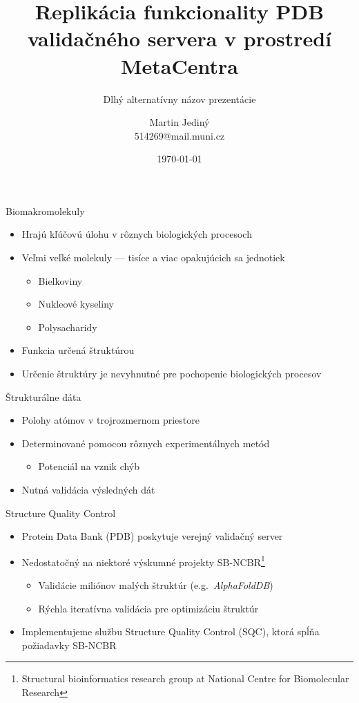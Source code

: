 \documentclass[
  aspectratio=169,
]{beamer}
\title[Structure Quality Control]{Replikácia funkcionality PDB validačného servera v prostredí MetaCentra}
\subtitle[Alternatívny názov prezentácie]{Dlhý alternatívny názov prezentácie}
\author[M.\, Jediný]{Martin Jediný\texorpdfstring{\\}{, }514269@mail.muni.cz}
\institute[FI MU]{Fakulta informatiky Masarykovej univerzity}
\date{\today}
\begin{document}
\begin{frame}[plain]
\maketitle
\end{frame}

\begin{frame}{Biomakromolekuly}
\begin{itemize}
  \item Hrajú kľúčovú úlohu v rôznych biologických procesoch
  \item Veľmi veľké molekuly --- tisíce a viac opakujúcich sa jednotiek
  \begin{itemize}
    \item Bielkoviny
    \item Nukleové kyseliny
    \item Polysacharidy
  \end{itemize}
  \item Funkcia určená štruktúrou
  \item Určenie štruktúry je nevyhnutné pre pochopenie biologických procesov
\end{itemize}
\end{frame}

\begin{frame}{Štrukturálne dáta}
\begin{itemize}
  \item Polohy atómov v trojrozmernom priestore
  \item Determinované pomocou rôznych experimentálnych metód
  \begin{itemize}
    \item Potenciál na vznik chýb
  \end{itemize}
  \item Nutná validácia výsledných dát
\end{itemize}
\end{frame}

\begin{frame}{Structure Quality Control}
\begin{itemize}
  \item Protein Data Bank (PDB) poskytuje verejný validačný server 
  \item Nedostatočný na niektoré výskumné projekty SB-NCBR\footnote{Structural bioinformatics research group at National Centre for Biomolecular Research}
  \begin{itemize}
    \item Validácie miliónov malých štruktúr (e.g.\ \emph{AlphaFoldDB})
    \item Rýchla iteratívna validácia pre optimizáciu štruktúr
  \end{itemize}
  \item Implementujeme službu Structure Quality Control (SQC), ktorá spĺňa požiadavky SB-NCBR
\end{itemize}
\end{frame}
\end{document}
